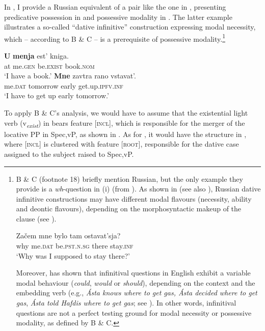 \documentclass[output=paper,colorlinks,citecolor=brown,nonflat]{./langscibook}
\begin{document}
In , I provide a Russian equivalent of a pair like the one in , presenting predicative possession in  and possessive modality in . The latter example illustrates a so-called “dative infinitive” construction expressing modal necessity, which – according to B \& C – is a prerequisite of possessive modality.\footnote{B \& C (footnote 18) briefly mention Russian, but the only example they provide is a \textit{wh}{}-question in (i) (from \citealt[105]{Jung2011}). As shown in \citet{Tsedryk2018} (see also \citealt{Fortuin2007}), Russian dative infinitive constructions may have different modal flavours (necessity, ability and deontic flavours), depending on the morphosyntactic makeup of the clause (see ).

\ea%
    \gll    Začem  mne       bylo          tam     ostavat’sja?\\
            why     me.\textsc{dat}   be.\textsc{pst.n.sg}  there   stay.\textsc{inf}\\
    \glt    ‘Why was I supposed to stay there?’      
\z    

Moreover, \citet[ch. 4]{Bhatt2006} has shown that infinitival questions in English exhibit a variable modal behaviour (\textit{could}, \textit{would} or \textit{should}), depending on the context and the embedding verb (e.g., \textit{Ásta knows where to get gas, Ásta decided where to get gas}, \textit{Ásta told Hafdis where to get gas}; see \citealt[124]{Bhatt2006}). In other words, infinitival questions are not a perfect testing ground for modal necessity or possessive modality, as defined by B \& C.} 

\ea%
    \label{ex:tsedryk:6}
    \ea\label{ex:tsedryk:6a}
    \gll    \textbf{U}  \textbf{menja}     {est’}           {kniga}.\\
            at  me.\textsc{gen}   be.\textsc{exist}    book.\textsc{nom}\\
    \glt    ‘I have a book.’
    \ex\label{ex:tsedryk:6b}
    \gll    \textbf{{Mne}}      {zavtra}       {rano}   {vstavat’}.\\
            me.\textsc{dat}  tomorrow  early  get.up.\textsc{ipfv.inf}\\
    \glt    ‘I have to get up early tomorrow.’ \hfill \citep[ex. (20a)]{Tsedryk2018}  
    \z
\z

To apply B \& C’s analysis, we would have to assume that the existential light verb (v\textit{\textsubscript{exist}}) in  bears feature [\textsc{incl}], which is responsible for the merger of the locative PP in Spec,vP, as shown in . As for , it would have the structure in , where [\textsc{incl}] is clustered with feature [\textsc{root}], responsible for the dative case assigned to the subject raised to Spec,vP.
\end{document}
